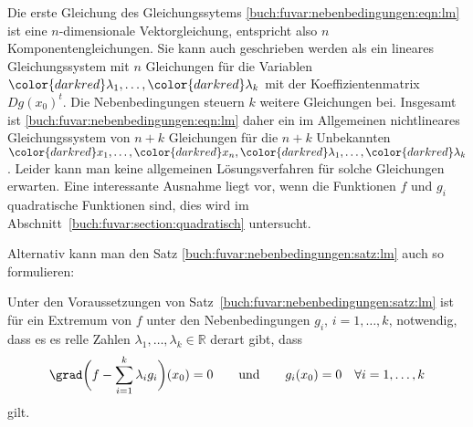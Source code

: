 Die erste Gleichung des Gleichungssytems
\eqref{buch:fuvar:nebenbedingungen:eqn:lm}
ist eine $n$-dimensionale Vektorgleichung, entspricht also $n$
Komponentengleichungen.
Sie kann auch geschrieben werden als ein lineares Gleichungssystem
mit $n$ Gleichungen für die Variablen
${\color{darkred}\lambda_1},\dots,{\color{darkred}\lambda_k}$
mit der Koeffizientenmatrix $Dg(x_0)^t$.
Die Nebenbedingungen steuern $k$ weitere Gleichungen bei.
Insgesamt ist \eqref{buch:fuvar:nebenbedingungen:eqn:lm}
daher ein im Allgemeinen nichtlineares Gleichungssystem von $n+k$
Gleichungen für die $n+k$ Unbekannten
\(
{\color{darkred}x_1},\dots,{\color{darkred}x_n},
{\color{darkred}\lambda_1},\dots,{\color{darkred}\lambda_k}
\).
Leider kann man keine allgemeinen Lösungsverfahren für solche
Gleichungen erwarten.
Eine interessante Ausnahme liegt vor, wenn die Funktionen $f$ und $g_i$
quadratische Funktionen sind, dies wird im
Abschnitt~\ref{buch:fuvar:section:quadratisch}
untersucht.

Alternativ kann man den Satz
\ref{buch:fuvar:nebenbedingungen:satz:lm}
auch so formulieren:

\begin{satz}
\label{buch:fuvar:nebenbedingungen:satz:lm2}
Unter den Voraussetzungen von Satz~\eqref{buch:fuvar:nebenbedingungen:satz:lm}
ist für ein Extremum von $f$ unter den Nebenbedingungen $g_i$, $i=1,\dots,k$,
notwendig, dass es
es relle Zahlen $\lambda_1,\dots,\lambda_k\in\mathbb{R}$ derart gibt,
dass 
\[
\grad\biggl(f-\sum_{i=1}^k \lambda_ig_i\biggr)(x_0) = 0
\qquad\text{und}\qquad
g_i(x_0)=0\quad \forall i=1,\dots,k
\]
gilt.
\end{satz}

